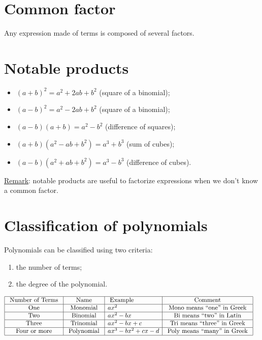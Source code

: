 \documentclass{article}
\newcommand{\figbox}[1]{ 
    \begin{figure*}[ht!]        
        \begin{center}            
            \fbox{#1}        
        \end{center}    
    \end{figure*}
}
\begin{document}
\section{Common factor}
Any expression made of terms is composed of several factors.
\figbox{$x^2+x^3+x= x(x+x^2+1),\ \forall x \in \mathbb{R}$}

\section{Notable products}
\begin{itemize}
    \item $(a+b)^2=a^2+2ab+b^2$ (square of a binomial);
    \item $(a-b)^2=a^2-2ab+b^2$ (square of a binomial);
    \item $(a-b)(a+b)=a^2-b^2$ (difference of squares);
    \item $(a+b)(a^2-ab+b^2)=a^3+b^3$ (sum of cubes);
    \item $(a-b)(a^2+ab+b^2)=a^3-b^3$ (difference of cubes).
\end{itemize}

\underline{Remark}: notable products are useful to factorize expressions when we don't know a common factor.

\section{Classification of polynomials}
Polynomials can be classified using two criteria: 
\begin{enumerate}
    \item the number of terms;
    \item the degree of the polynomial.
\end{enumerate}
\begin{equation*}
    \begin{aligned}
        &\begin{array}{|c|c|l|c|}
        \hline \text { Number of Terms } & \text { Name } & \text { Example } & \text { Comment } \\
        \hline \text { One } & \text { Monomial } & ax^2 & \text { Mono means ``one'' in Greek } \\
        \hline \text { Two } & \text { Binomial } & ax^2-b x & \text { Bi means ``two'' in Latin } \\
        \hline \text { Three } & \text { Trinomial } & ax^2-b x+c & \text { Tri means ``three'' in Greek } \\
        \hline \text { Four or more } & \text { Polynomial } & a x^3-b x^2+c x-d & \text { Poly means ``many'' in Greek } \\
        \hline
        \end{array}
    \end{aligned}
\end{equation*}
\end{document}
